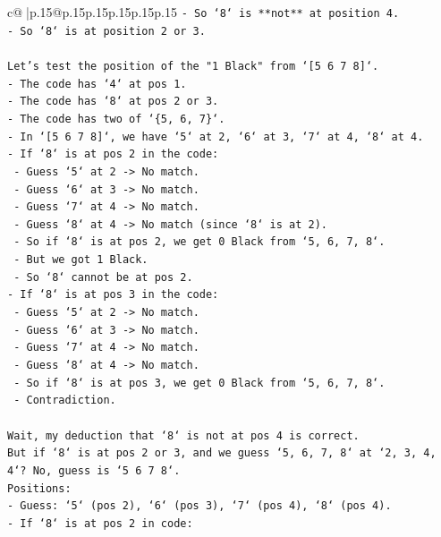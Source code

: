\documentclass{article}
\begin{document}
{\begin{supertabular}{c@{$\;$}|p{.15\linewidth}@{}p{.15\linewidth}p{.15\linewidth}p{.15\linewidth}p{.15\linewidth}p{.15\linewidth}}
{{{\texttt{{-} So `8` is **not** at position 4.} \\
\texttt{{-} So `8` is at position 2 or 3.} \\
\\ 
\texttt{Let's test the position of the "1 Black" from `{[}5 6 7 8{]}`.} \\
\texttt{{-} The code has `4` at pos 1.} \\
\texttt{{-} The code has `8` at pos 2 or 3.} \\
\texttt{{-} The code has two of `\{5, 6, 7\}`.} \\
\texttt{{-} In `{[}5 6 7 8{]}`, we have `5` at 2, `6` at 3, `7` at 4, `8` at 4.} \\
\texttt{{-} If `8` is at pos 2 in the code:} \\
\texttt{    {-} Guess `5` at 2 {-}> No match.} \\
\texttt{    {-} Guess `6` at 3 {-}> No match.} \\
\texttt{    {-} Guess `7` at 4 {-}> No match.} \\
\texttt{    {-} Guess `8` at 4 {-}> No match (since `8` is at 2).} \\
\texttt{    {-} So if `8` is at pos 2, we get 0 Black from `5, 6, 7, 8`.} \\
\texttt{    {-} But we got 1 Black.} \\
\texttt{    {-} So `8` cannot be at pos 2.} \\
\texttt{{-} If `8` is at pos 3 in the code:} \\
\texttt{    {-} Guess `5` at 2 {-}> No match.} \\
\texttt{    {-} Guess `6` at 3 {-}> No match.} \\
\texttt{    {-} Guess `7` at 4 {-}> No match.} \\
\texttt{    {-} Guess `8` at 4 {-}> No match.} \\
\texttt{    {-} So if `8` is at pos 3, we get 0 Black from `5, 6, 7, 8`.} \\
\texttt{    {-} Contradiction.} \\
\\ 
\texttt{Wait, my deduction that `8` is not at pos 4 is correct.} \\
\texttt{But if `8` is at pos 2 or 3, and we guess `5, 6, 7, 8` at `2, 3, 4, 4`? No, guess is `5 6 7 8`.} \\
\texttt{Positions:} \\
\texttt{{-} Guess: `5` (pos 2), `6` (pos 3), `7` (pos 4), `8` (pos 4).} \\
\texttt{{-} If `8` is at pos 2 in code:} \\
}}}
\end{supertabular}}
\end{document}
